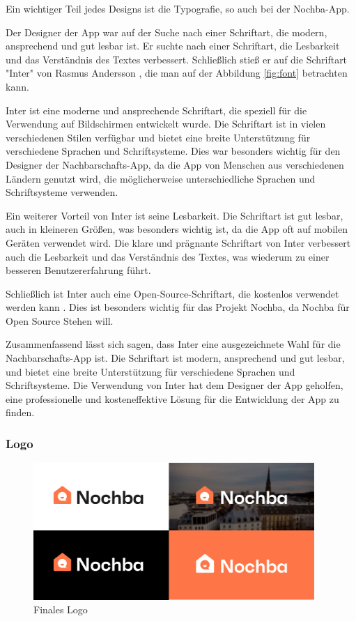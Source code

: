Ein wichtiger Teil jedes Designs ist die Typografie, so auch bei der Nochba-App.

Der Designer der App war auf der Suche nach einer
Schriftart, die modern, ansprechend und gut lesbar ist. Er
suchte nach einer Schriftart, die Lesbarkeit und das
Verständnis des Textes verbessert. Schließlich stieß er auf
die Schriftart "Inter" von Rasmus Andersson
\cite{inter-font}, die man auf der Abbildung \ref{fig:font}
betrachten kann.

Inter ist eine moderne und ansprechende Schriftart, die speziell für die Verwendung auf Bildschirmen entwickelt wurde. Die Schriftart ist in vielen verschiedenen Stilen verfügbar und bietet eine breite Unterstützung für verschiedene Sprachen und Schriftsysteme. Dies war besonders wichtig für den Designer der Nachbarschafts-App, da die App von Menschen aus verschiedenen Ländern genutzt wird, die möglicherweise unterschiedliche Sprachen und Schriftsysteme verwenden.

Ein weiterer Vorteil von Inter ist seine Lesbarkeit. Die Schriftart ist gut lesbar, auch in kleineren Größen, was besonders wichtig ist, da die App oft auf mobilen Geräten verwendet wird. Die klare und prägnante Schriftart von Inter verbessert auch die Lesbarkeit und das Verständnis des Textes, was wiederum zu einer besseren Benutzererfahrung führt.

Schließlich ist Inter auch eine Open-Source-Schriftart, die kostenlos verwendet werden kann \cite{inter-font}. Dies ist besonders wichtig für das Projekt Nochba, da Nochba für Open Source Stehen will.

Zusammenfassend lässt sich sagen, dass Inter eine ausgezeichnete Wahl für die Nachbarschafts-App ist. Die Schriftart ist modern, ansprechend und gut lesbar, und bietet eine breite Unterstützung für verschiedene Sprachen und Schriftsysteme. Die Verwendung von Inter hat dem Designer der App geholfen, eine professionelle und kosteneffektive Lösung für die Entwicklung der App zu finden.
\subsubsection{Logo}

\begin{figure}[h]
  \centering
  \includegraphics[width=0.95\textwidth]{pics/final-logo.png}
  \caption{Finales Logo}
  \label{fig:final-logo}
\end{figure}

